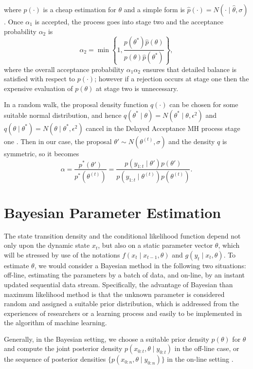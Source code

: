 where $\hat{p}(\cdot)$ is a cheap estimation for $\theta$ and a simple form is $\hat{p}(\cdot)=N(\cdot\mid \hat{\theta},\sigma)$. Once $\alpha_1$ is accepted, the process goes into stage two and the acceptance probability $\alpha_2$ is
\begin{equation}
\alpha_2=\min \left\lbrace  1,\frac{p(\theta^*)\hat{p}(\theta) }{p(\theta)\hat{p}(\theta^*)} \right\rbrace,
\end{equation}
where the overall acceptance probability $\alpha_1\alpha_2$ ensures that detailed balance is satisfied with respect to $p(\cdot)$; however if a rejection occurs at stage one then the expensive evaluation of $p(\theta)$ at stage two is unnecessary.

In a random walk, the proposal density function $q(\cdot)$ can be chosen for some suitable normal distribution, and hence $q(\theta^*\mid \theta)=N(\theta^*\mid \theta,\epsilon^2)$ and $q(\theta\mid \theta^*)=N(\theta\mid \theta^*,\epsilon^2)$ cancel in the Delayed Acceptance MH process stage one \cite{sherlock2016adaptive}. Then in our case, the proposal $\theta' \sim N(\theta^{(t)}, \sigma)$ and the density $q$ is symmetric, so it becomes
\begin{equation}
\alpha=\frac{p^*(\theta')}{p^*(\theta^{(t)})}=\frac{p(y_{1:t}\mid \theta')p(\theta')}{p(y_{1:t}\mid \theta^{(t)})p(\theta^{(t)})}.
\end{equation}


\section{Bayesian Parameter Estimation}

The state transition density and the conditional likelihood function depend not only upon the dynamic state $x_t$, but also on a static parameter vector $\theta$, which will be stressed by use of the notations $f(x_t \mid x_{t-1},\theta)$ and $g(y_t\mid x_t,\theta)$. To estimate $\theta$, we would consider a Bayesian method in the following two situations: off-line, estimating the parameters by a batch of data, and on-line, by an instant updated sequential data stream. Specifically, the advantage of Bayesian than maximum likelihood method is that the unknown parameter is considered random and assigned a suitable prior distribution, which is addressed from the experiences of researchers or a learning process and easily to be implemented in the algorithm of machine learning.

Generally, in the Bayesian setting, we choose a suitable prior density $p(\theta)$ for $\theta$ and compute the joint posterior density $p(x_{0:t},\theta \mid y_{0:t})$ in the off-line case, or the sequence of posterior densities $\{ p(x_{0:n},\theta \mid y_{0:n})\}$ in the on-line setting \cite{kantas2009overview}.



